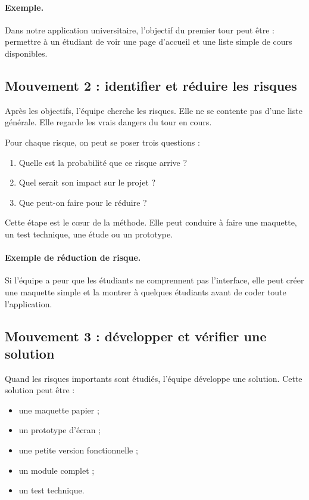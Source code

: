 \documentclass[12pt,a4paper]{article}
\begin{document}
\paragraph{Exemple.}
Dans notre application universitaire, l'objectif du premier tour peut être : permettre à un étudiant de voir une page d'accueil et une liste simple de cours disponibles.

\subsection{Mouvement 2 : identifier et réduire les risques}

Après les objectifs, l'équipe cherche les risques. Elle ne se contente pas d'une liste générale. Elle regarde les vrais dangers du tour en cours.

Pour chaque risque, on peut se poser trois questions :

\begin{enumerate}
    \item Quelle est la probabilité que ce risque arrive ?
    \item Quel serait son impact sur le projet ?
    \item Que peut-on faire pour le réduire ?
\end{enumerate}

Cette étape est le cœur de la méthode. Elle peut conduire à faire une maquette, un test technique, une étude ou un prototype.

\paragraph{Exemple de réduction de risque.}
Si l'équipe a peur que les étudiants ne comprennent pas l'interface, elle peut créer une maquette simple et la montrer à quelques étudiants avant de coder toute l'application.

\subsection{Mouvement 3 : développer et vérifier une solution}

Quand les risques importants sont étudiés, l'équipe développe une solution. Cette solution peut être :

\begin{itemize}
    \item une maquette papier ;
    \item un prototype d'écran ;
    \item une petite version fonctionnelle ;
    \item un module complet ;
    \item un test technique.
\end{itemize}
\end{document}
